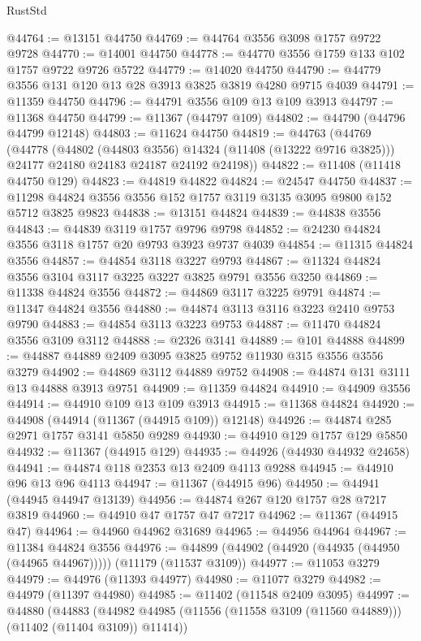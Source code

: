 \begin{lexlean}{RustStd}
\begin{coremodule}
@44764 := @13151 @44750
@44769 := @44764 @3556 @3098 @1757 @9722 @9728
@44770 := @14001 @44750
@44778 := @44770 @3556 @1759 @133 @102 @1757 @9722 @9726 @5722
@44779 := @14020 @44750
@44790 := @44779 @3556 @131 @120 @13 @28 @3913 @3825 @3819 @4280 @9715 @4039
@44791 := @11359 @44750
@44796 := @44791 @3556 @109 @13 @109 @3913
@44797 := @11368 @44750
@44799 := @11367 (@44797 @109)
@44802 := @44790 (@44796 @44799 @12148)
@44803 := @11624 @44750
@44819 := @44763
    (@44769
      (@44778
        (@44802 (@44803 @3556) @14324 (@11408 (@13222 @9716 @3825)))
        @24177
        @24180
        @24183
        @24187
        @24192
        @24198))
@44822 := @11408 (@11418 @44750 @129)
@44823 := @44819 @44822
@44824 := @24547 @44750
@44837 := @11298 @44824 @3556 @3556 @152 @1757 @3119 @3135 @3095 @9800 @152 @5712 @3825 @9823
@44838 := @13151 @44824
@44839 := @44838 @3556
@44843 := @44839 @3119 @1757 @9796 @9798
@44852 := @24230 @44824 @3556 @3118 @1757 @20 @9793 @3923 @9737 @4039
@44854 := @11315 @44824 @3556
@44857 := @44854 @3118 @3227 @9793
@44867 := @11324 @44824 @3556 @3104 @3117 @3225 @3227 @3825 @9791 @3556 @3250
@44869 := @11338 @44824 @3556
@44872 := @44869 @3117 @3225 @9791
@44874 := @11347 @44824 @3556
@44880 := @44874 @3113 @3116 @3223 @2410 @9753 @9790
@44883 := @44854 @3113 @3223 @9753
@44887 := @11470 @44824 @3556 @3109 @3112
@44888 := @2326 @3141
@44889 := @101 @44888
@44899 := @44887 @44889 @2409 @3095 @3825 @9752 @11930 @315 @3556 @3556 @3279
@44902 := @44869 @3112 @44889 @9752
@44908 := @44874 @131 @3111 @13 @44888 @3913 @9751
@44909 := @11359 @44824
@44910 := @44909 @3556
@44914 := @44910 @109 @13 @109 @3913
@44915 := @11368 @44824
@44920 := @44908 (@44914 (@11367 (@44915 @109)) @12148)
@44926 := @44874 @285 @2971 @1757 @3141 @5850 @9289
@44930 := @44910 @129 @1757 @129 @5850
@44932 := @11367 (@44915 @129)
@44935 := @44926 (@44930 @44932 @24658)
@44941 := @44874 @118 @2353 @13 @2409 @4113 @9288
@44945 := @44910 @96 @13 @96 @4113
@44947 := @11367 (@44915 @96)
@44950 := @44941 (@44945 @44947 @13139)
@44956 := @44874 @267 @120 @1757 @28 @7217 @3819
@44960 := @44910 @47 @1757 @47 @7217
@44962 := @11367 (@44915 @47)
@44964 := @44960 @44962 @31689
@44965 := @44956 @44964
@44967 := @11384 @44824 @3556
@44976 := @44899 (@44902 (@44920 (@44935 (@44950 (@44965 @44967))))) (@11179 (@11537 @3109))
@44977 := @11053 @3279
@44979 := @44976 (@11393 @44977)
@44980 := @11077 @3279
@44982 := @44979 (@11397 @44980)
@44985 := @11402 (@11548 @2409 @3095)
@44997 := @44880
    (@44883 (@44982 @44985 (@11556 (@11558 @3109 (@11560 @44889))) (@11402 (@11404 @3109)) @11414))

\end{coremodule}
\end{lexlean}

